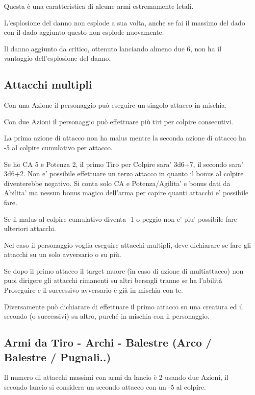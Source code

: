 \documentclass[a4paper,11pt,twoside,openany]{book}
\begin{document}
Questa è una caratteristica di alcune armi estremamente letali.

L'esplosione del danno non esplode a sua volta, anche se fai il massimo del dado con il dado aggiunto questo non esplode nuovamente.

Il danno aggiunto da critico, ottenuto lanciando almeno due 6, non ha il vantaggio dell'esplosione del danno.

\subsection{Attacchi multipli}

Con una Azione il personaggio può eseguire un singolo attacco in mischia.

Con due Azioni il personaggio può effettuare più tiri per colpire consecutivi.

La prima azione di attacco non ha malus mentre la seconda azione di attacco ha -5 al colpire cumulativo per attacco.

Se ho CA 5 e Potenza 2, il primo Tiro per Colpire sara' 3d6+7, il secondo sara' 3d6+2. Non e' possibile effettuare un terzo attacco in quanto il bonus al colpire diventerebbe negativo.
Si conta solo CA e Potenza/Agilita' e bonus dati da Abilita' ma nessun bonus magico dell'arma per capire quanti attacchi e' possibile fare.

Se il malus al colpire cumulativo diventa -1 o peggio non e' piu' possibile fare ulteriori attacchi.

Nel caso il personaggio voglia eseguire attacchi multipli, deve dichiarare se fare gli attacchi su un solo avversario o su più.

Se dopo il primo attacco il target muore (in caso di azione di multiattacco) non puoi dirigere gli attacchi rimanenti su altri bersagli tranne se ha l'abilità Proseguire e il successivo avversario è già in mischia con te.

Diversamente può dichiarare di effettuare il primo attacco su una creatura ed il secondo (o successivi) su altro, purché in mischia con il personaggio.

\subsection{Armi da Tiro - Archi - Balestre (Arco / Balestre / Pugnali..)}

Il numero di attacchi massimi con armi da lancio è 2 usando due Azioni, il secondo lancio si considera un secondo attacco con un -5 al colpire.
\end{document}
